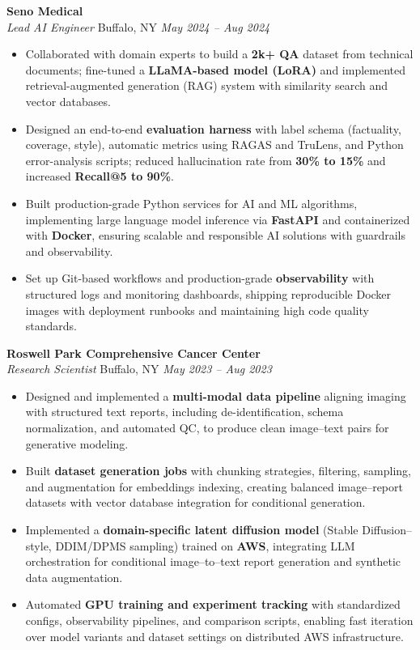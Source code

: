 \vspace*{-1pt}
\item \textbf{Seno Medical}\\
\textit{Lead AI Engineer} \hfill Buffalo, NY \quad \textit{May 2024 -- Aug 2024}
\vspace*{-3pt}
\begin{itemize}[leftmargin=0.2in, topsep=1pt]
  \item Collaborated with domain experts to build a \textbf{2k+ QA} dataset from technical documents; fine-tuned a \textbf{LLaMA-based model (LoRA)} and implemented retrieval-augmented generation (RAG) system with similarity search and vector databases.
  \item Designed an end-to-end \textbf{evaluation harness} with label schema (factuality, coverage, style), automatic metrics using RAGAS and TruLens, and Python error-analysis scripts; reduced hallucination rate from \textbf{30\% to 15\%} and increased \textbf{Recall@5 to 90\%}.
  \item Built production-grade Python services for AI and ML algorithms, implementing large language model inference via \textbf{FastAPI} and containerized with \textbf{Docker}, ensuring scalable and responsible AI solutions with guardrails and observability.
  \item Set up Git-based workflows and production-grade \textbf{observability} with structured logs and monitoring dashboards, shipping reproducible Docker images with deployment runbooks and maintaining high code quality standards.
\end{itemize}

\vspace*{-1pt}
\item \textbf{Roswell Park Comprehensive Cancer Center}\\
\textit{Research Scientist} \hfill Buffalo, NY \quad \textit{May 2023 -- Aug 2023}
\vspace*{-3pt}
\begin{itemize}[leftmargin=0.2in, topsep=1pt]
  \item Designed and implemented a \textbf{multi-modal data pipeline} aligning imaging with structured text reports, including de-identification, schema normalization, and automated QC, to produce clean image–text pairs for generative modeling.
  \item Built \textbf{dataset generation jobs} with chunking strategies, filtering, sampling, and augmentation for embeddings indexing, creating balanced image–report datasets with vector database integration for conditional generation.
  \item Implemented a \textbf{domain-specific latent diffusion model} (Stable Diffusion–style, DDIM/DPMS sampling) trained on \textbf{AWS}, integrating LLM orchestration for conditional image–to–text report generation and synthetic data augmentation.
  \item Automated \textbf{GPU training and experiment tracking} with standardized configs, observability pipelines, and comparison scripts, enabling fast iteration over model variants and dataset settings on distributed AWS infrastructure.
\end{itemize}
